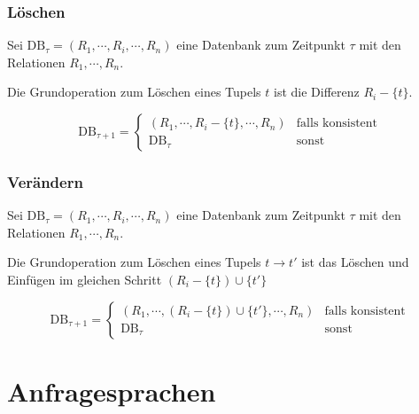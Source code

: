 \documentclass[a4paper, 11pt, accentcolor = tud3b]{tudreport}
\newcommand{\DB}{\text{DB}}
\begin{document}
            \subsection{Löschen} %
	            Sei \( \DB_\tau = (R_1, \cdots, R_i, \cdots, R_n) \) eine Datenbank zum Zeitpunkt \(\tau\) mit den Relationen \( R_1, \cdots, R_n \).
	            
	            Die Grundoperation zum Löschen eines Tupels \( t \) ist die Differenz \( R_i - \{t\} \).
	            
	            \begin{equation*}
		            \DB_{\tau + 1} =
			            \begin{cases*}
				            (R_1, \cdots, R_i - \{t\}, \cdots, R_n) & \text{falls konsistent} \\
				            \DB_\tau                                & \text{sonst}
			            \end{cases*}
	            \end{equation*}

            \subsection{Verändern} %
	            Sei \( \DB_\tau = (R_1, \cdots, R_i, \cdots, R_n) \) eine Datenbank zum Zeitpunkt \(\tau\) mit den Relationen \( R_1, \cdots, R_n \).
	            
	            Die Grundoperation zum Löschen eines Tupels \( t \rightarrow t' \) ist das Löschen und Einfügen im gleichen Schritt \( (R_i - \{t\}) \cup \{t'\} \)
	            
	            \begin{equation*}
		            \DB_{\tau + 1} =
			            \begin{cases*}
				            (R_1, \cdots, (R_i - \{t\}) \cup \{t'\}, \cdots, R_n) & \text{falls konsistent} \\
				            \DB_\tau                                              & \text{sonst}
			            \end{cases*}
	            \end{equation*}

    \chapter{Anfragesprachen} %
	    \label{c:sql}
    
\end{document}
